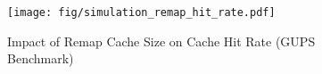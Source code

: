 \begin{figure}[t]
  \centering
  \texttt{[image: fig/simulation\_remap\_hit\_rate.pdf]}
  \caption{Impact of Remap Cache Size on Cache Hit Rate (GUPS Benchmark)}
  \label{fig:simulation_remap_hit_rate}
\end{figure}